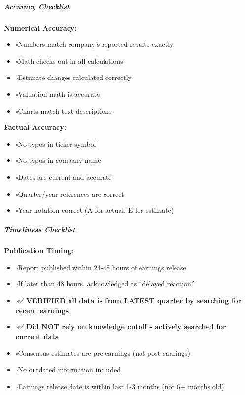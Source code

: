 \documentclass[11pt]{article}
\newcommand{\UncheckedBox}{$\square$}
\begin{document}
\subparagraph{Accuracy Checklist}\mbox{}\par

\textbf{Numerical Accuracy:}

\begin{itemize}[leftmargin=*,itemsep=2pt,topsep=2pt]
\item {} \UncheckedBox Numbers match company's reported results exactly
\item {} \UncheckedBox Math checks out in all calculations
\item {} \UncheckedBox Estimate changes calculated correctly
\item {} \UncheckedBox Valuation math is accurate
\item {} \UncheckedBox Charts match text descriptions
\end{itemize}

\textbf{Factual Accuracy:}

\begin{itemize}[leftmargin=*,itemsep=2pt,topsep=2pt]
\item {} \UncheckedBox No typos in ticker symbol
\item {} \UncheckedBox No typos in company name
\item {} \UncheckedBox Dates are current and accurate
\item {} \UncheckedBox Quarter/year references are correct
\item {} \UncheckedBox Year notation correct (A for actual, E for estimate)
\end{itemize}

\subparagraph{Timeliness Checklist}\mbox{}\par

\textbf{Publication Timing:}

\begin{itemize}[leftmargin=*,itemsep=2pt,topsep=2pt]
\item {} \UncheckedBox Report published within 24-48 hours of earnings release
\item {} \UncheckedBox If later than 48 hours, acknowledged as ``delayed reaction''
\item {} \UncheckedBox ✅ \textbf{VERIFIED all data is from LATEST quarter by searching for recent earnings}
\item {} \UncheckedBox ✅ \textbf{Did NOT rely on knowledge cutoff - actively searched for current data}
\item {} \UncheckedBox Consensus estimates are pre-earnings (not post-earnings)
\item {} \UncheckedBox No outdated information included
\item {} \UncheckedBox Earnings release date is within last 1-3 months (not 6+ months old)
\end{itemize}
\end{document}
